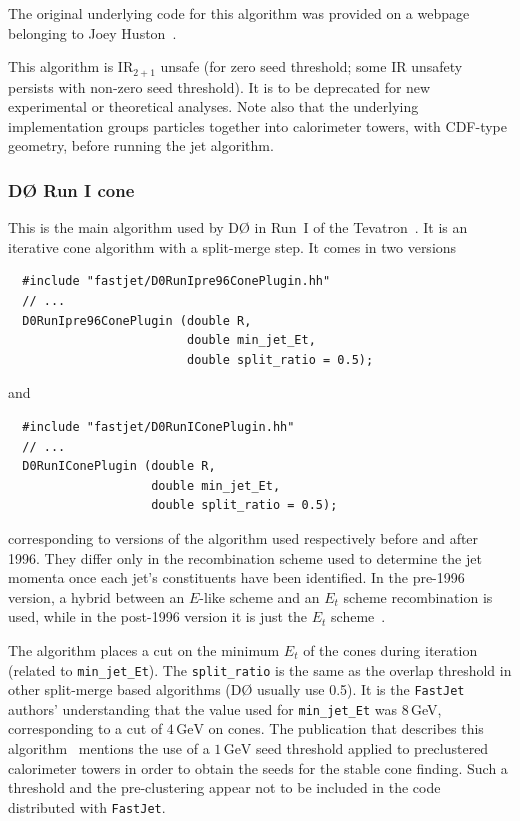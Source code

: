\documentclass[12pt,a4]{article}
\newcommand{\fastjet}{\texttt{FastJet}\xspace}
\newcommand{\Dzero}{D\O\xspace}
\newcommand{\GeV}{\,\text{GeV}}
\begin{document}
The original underlying code for this algorithm was provided on a
webpage belonging to Joey Huston~\cite{CDFCones}.

This algorithm is IR$_{2+1}$ unsafe (for zero seed threshold; some
IR unsafety persists with non-zero seed threshold). 
It is to be
deprecated for new experimental or theoretical analyses.
%
Note also that the underlying implementation groups particles together
into calorimeter towers, with CDF-type geometry, before running the
jet algorithm. 

\subsubsection{\Dzero Run I cone}

This is the main algorithm used by \Dzero in Run~I of the
Tevatron~\cite{Abbott:1997fc}. It is an iterative cone algorithm
with a split-merge step. It comes in two versions
\begin{lstlisting}
  #include "fastjet/D0RunIpre96ConePlugin.hh"
  // ...
  D0RunIpre96ConePlugin (double R, 
                         double min_jet_Et, 
                         double split_ratio = 0.5);
\end{lstlisting}
and
\begin{lstlisting}
  #include "fastjet/D0RunIConePlugin.hh"
  // ...
  D0RunIConePlugin (double R, 
                    double min_jet_Et, 
                    double split_ratio = 0.5);
\end{lstlisting}
corresponding to versions of the algorithm used respectively before
and after 1996.
%
They differ only in the recombination scheme used to determine the jet
momenta once each jet's constituents have been identified.
%
In the pre-1996 version, a hybrid between an $E$-like scheme and an
$E_t$ scheme recombination is used, while in the post-1996 version it
is just the $E_t$ scheme~\cite{Abbott:1997fc}.

The algorithm places a cut on the minimum $E_t$ of the cones during
iteration (related to \verb|min_jet_Et|).
%
The \verb|split_ratio| is the same as the overlap threshold in other
split-merge based algorithms (\Dzero usually use 0.5).
%
It is the \fastjet authors' understanding that the value 
used for \verb|min_jet_Et| was 8\,GeV, corresponding to a cut of
$4\GeV$ on cones.
%
The publication that describes this algorithm~\cite{Abbott:1997fc}
mentions the use of a $1\GeV$ seed threshold applied to preclustered
calorimeter towers in order to obtain the seeds for the stable cone
finding. 
%
Such a threshold and the pre-clustering appear not to be included in the code
distributed with \fastjet.
\end{document}
